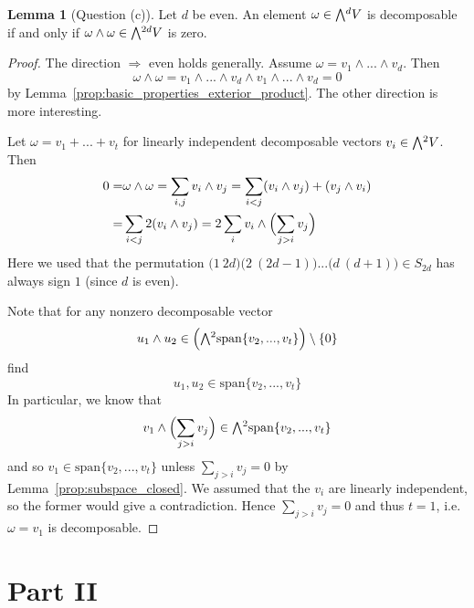 \documentclass{scrartcl}
\newcommand{\extpow}{\mathchoice{{\textstyle\bigwedge}}
    {{\bigwedge}}
    {{\textstyle\wedge}}
    {{\scriptstyle\wedge}}}
\newcommand{\vspan}{\mathrm{span}}
\theoremstyle{definition}
\newtheorem{lemma}[subsection]{Lemma}
\begin{document}
\begin{lemma}[Question (c)]
    \label{prop:characterization_decomposable_d_even}
    Let $d$ be even.
    An element $\omega \in \extpow^d V$ is decomposable if and only if $\omega \wedge \omega \in \extpow^{2d} V$ is zero.
\end{lemma}
\begin{proof}
    The direction $\Rightarrow$ even holds generally. Assume $\omega = v_1 \wedge ... \wedge v_d$.
    Then
    \begin{equation*}
        \omega \wedge \omega = v_1 \wedge ... \wedge v_d \wedge v_1 \wedge ... \wedge v_d = 0
    \end{equation*}
    by Lemma~\ref{prop:basic_properties_exterior_product}. 
    The other direction is more interesting.

    Let $\omega = v_1 + ... + v_t$ for linearly independent decomposable vectors $v_i \in \extpow^2 V$.
    Then
    \begin{align*}
        0 =& \omega \wedge \omega = \sum_{i, j} v_i \wedge v_j = \sum_{i < j} (v_i \wedge v_j) + (v_j \wedge v_i) \\
        =& \sum_{i < j} 2(v_i \wedge v_j) = 2\sum_i v_i \wedge \Bigl( \sum_{j > i} v_j \Bigr)
    \end{align*}
    Here we used that the permutation $\bigl(1 \ 2d\bigr)\bigl(2 \ (2d - 1)\bigr)...\bigl(d \ (d + 1)\bigr) \in S_{2d}$ has always sign $1$ (since $d$ is even).

    Note that for any nonzero decomposable vector
    \begin{equation*}
        u_1 \wedge u_2 \in \Bigl( \extpow^2 \vspan\{v_2, ..., v_t\} \Bigr) \setminus \{0\}
    \end{equation*}
    find
    \begin{equation*}
        u_1, u_2 \in \vspan\{v_2, ..., v_t\}
    \end{equation*}
    In particular, we know that
    \begin{equation*}
        v_1 \wedge \Bigl( \sum_{j > i} v_j \Bigr) \in \extpow^2 \vspan\{v_2, ..., v_t\}
    \end{equation*}
    and so $v_1 \in \vspan\{v_2, ..., v_t\}$ unless $\sum_{j > i} v_j = 0$ by Lemma~\ref{prop:subspace_closed}.
    We assumed that the $v_i$ are linearly independent, so the former would give a contradiction.
    Hence $\sum_{j > i} v_j = 0$ and thus $t = 1$, i.e. $\omega = v_1$ is decomposable.
\end{proof}

\section{Part II}
\end{document}
